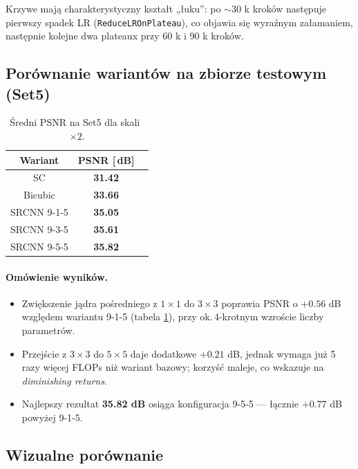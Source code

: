\documentclass[11pt]{article}
\begin{document}
Krzywe mają charakterystyczny kształt „łuku”:
po \(\sim\)30 k kroków następuje pierwszy spadek
LR (\texttt{ReduceLROnPlateau}), co objawia się wyraźnym załamaniem,
następnie kolejne dwa plateaux przy 60 k i 90 k kroków.

\subsection{Porównanie wariantów na zbiorze testowym (Set5)}

\begin{table}[h]
\centering
\begin{tabular}{@{}ccc@{}}
\toprule
Wariant & PSNR [$\,$dB] \\ \midrule
SC & \textbf{31.42} \\
Bicubic & \textbf{33.66} \\
SRCNN 9-1-5  & \textbf{35.05} \\
SRCNN 9-3-5  & \textbf{35.61} \\
SRCNN 9-5-5  & \textbf{35.82} \\ \bottomrule
\end{tabular}
\caption{Średni PSNR na Set5 dla skali~$\times2$.}
\label{tab:test_psnr}
\end{table}


\paragraph{Omówienie wyników.}
\begin{itemize}
  \item Zwiększenie jądra pośredniego z \(1\times1\) do \(3\times3\)
        poprawia PSNR o \(+0.56\) dB względem wariantu 9-1-5
        (tabela \ref{tab:test_psnr}), przy ok.\,4-krotnym wzroście
        liczby parametrów.
  \item Przejście z \(3\times3\) do \(5\times5\) daje dodatkowe
        \(+0.21\) dB, jednak wymaga już 5 razy więcej FLOPs niż
        wariant bazowy; korzyść maleje, co wskazuje na
        \emph{diminishing returns}.
  \item Najlepszy rezultat \textbf{35.82 dB} osiąga konfiguracja 9-5-5
        — łącznie \(+0.77\) dB powyżej 9-1-5.
\end{itemize}

\subsection{Wizualne porównanie}
\end{document}
